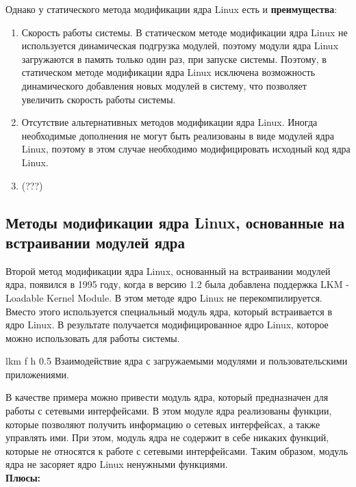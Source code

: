 Однако у статического метода модификации ядра Linux есть и \textbf{преимущества}:

\begin{enumerate}
    \item Скорость работы системы.
    В статическом методе модификации ядра Linux не используется динамическая подгрузка модулей, поэтому модули ядра Linux загружаются в память только один раз, при запуске системы.
    Поэтому, в статическом методе модификации ядра Linux исключена возможность динамического добавления новых модулей в систему, что позволяет увеличить скорость работы системы.
    \item Отсутствие альтернативных методов модификации ядра Linux.
    Иногда необходимые дополнения не могут быть реализованы в виде модулей ядра Linux, поэтому в этом случае необходимо модифицировать исходный код ядра Linux.
    \item (???)
\end{enumerate}

\subsection{Методы модификации ядра Linux, основанные на встраивании модулей ядра}\label{subsec:---linux-----}

Второй метод модификации ядра Linux, основанный на встраивании модулей ядра, появился в 1995 году, когда в версию 1.2 была добавлена поддержка LKM - Loadable Kernel Module.
В этом методе ядро Linux не перекомпилируется.
Вместо этого используется специальный модуль ядра, который встраивается в ядро Linux.
В результате получается модифицированное ядро Linux, которое можно использовать для работы системы.

{lkm} %
{f}
{h}
{0.5\textwidth} %
{Взаимодействие ядра с загружаемыми модулями и пользовательскими приложениями.} %

В качестве примера можно привести модуль ядра, который предназначен для работы с сетевыми интерфейсами.
В этом модуле ядра реализованы функции, которые позволяют получить информацию о сетевых интерфейсах, а также управлять ими.
При этом, модуль ядра не содержит в себе никаких функций, которые не относятся к работе с сетевыми интерфейсами.
Таким образом, модуль ядра не засоряет ядро Linux ненужными функциями.
\vspace{5mm}\\
\textbf{Плюсы:}

